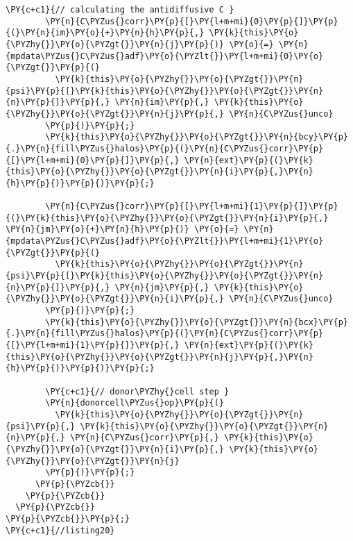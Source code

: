 \begin{Verbatim}[commandchars=\\\{\}]
        \PY{c+c1}{// calculating the antidiffusive C }
        \PY{n}{C\PYZus{}corr}\PY{p}{[}\PY{l+m+mi}{0}\PY{p}{]}\PY{p}{(}\PY{n}{im}\PY{o}{+}\PY{n}{h}\PY{p}{,} \PY{k}{this}\PY{o}{\PYZhy{}}\PY{o}{\PYZgt{}}\PY{n}{j}\PY{p}{)} \PY{o}{=} \PY{n}{mpdata\PYZus{}C\PYZus{}adf}\PY{o}{\PYZlt{}}\PY{l+m+mi}{0}\PY{o}{\PYZgt{}}\PY{p}{(}
          \PY{k}{this}\PY{o}{\PYZhy{}}\PY{o}{\PYZgt{}}\PY{n}{psi}\PY{p}{[}\PY{k}{this}\PY{o}{\PYZhy{}}\PY{o}{\PYZgt{}}\PY{n}{n}\PY{p}{]}\PY{p}{,} \PY{n}{im}\PY{p}{,} \PY{k}{this}\PY{o}{\PYZhy{}}\PY{o}{\PYZgt{}}\PY{n}{j}\PY{p}{,} \PY{n}{C\PYZus{}unco}
        \PY{p}{)}\PY{p}{;}
        \PY{k}{this}\PY{o}{\PYZhy{}}\PY{o}{\PYZgt{}}\PY{n}{bcy}\PY{p}{.}\PY{n}{fill\PYZus{}halos}\PY{p}{(}\PY{n}{C\PYZus{}corr}\PY{p}{[}\PY{l+m+mi}{0}\PY{p}{]}\PY{p}{,} \PY{n}{ext}\PY{p}{(}\PY{k}{this}\PY{o}{\PYZhy{}}\PY{o}{\PYZgt{}}\PY{n}{i}\PY{p}{,}\PY{n}{h}\PY{p}{)}\PY{p}{)}\PY{p}{;}

        \PY{n}{C\PYZus{}corr}\PY{p}{[}\PY{l+m+mi}{1}\PY{p}{]}\PY{p}{(}\PY{k}{this}\PY{o}{\PYZhy{}}\PY{o}{\PYZgt{}}\PY{n}{i}\PY{p}{,} \PY{n}{jm}\PY{o}{+}\PY{n}{h}\PY{p}{)} \PY{o}{=} \PY{n}{mpdata\PYZus{}C\PYZus{}adf}\PY{o}{\PYZlt{}}\PY{l+m+mi}{1}\PY{o}{\PYZgt{}}\PY{p}{(}
          \PY{k}{this}\PY{o}{\PYZhy{}}\PY{o}{\PYZgt{}}\PY{n}{psi}\PY{p}{[}\PY{k}{this}\PY{o}{\PYZhy{}}\PY{o}{\PYZgt{}}\PY{n}{n}\PY{p}{]}\PY{p}{,} \PY{n}{jm}\PY{p}{,} \PY{k}{this}\PY{o}{\PYZhy{}}\PY{o}{\PYZgt{}}\PY{n}{i}\PY{p}{,} \PY{n}{C\PYZus{}unco}
        \PY{p}{)}\PY{p}{;}
        \PY{k}{this}\PY{o}{\PYZhy{}}\PY{o}{\PYZgt{}}\PY{n}{bcx}\PY{p}{.}\PY{n}{fill\PYZus{}halos}\PY{p}{(}\PY{n}{C\PYZus{}corr}\PY{p}{[}\PY{l+m+mi}{1}\PY{p}{]}\PY{p}{,} \PY{n}{ext}\PY{p}{(}\PY{k}{this}\PY{o}{\PYZhy{}}\PY{o}{\PYZgt{}}\PY{n}{j}\PY{p}{,}\PY{n}{h}\PY{p}{)}\PY{p}{)}\PY{p}{;}

        \PY{c+c1}{// donor\PYZhy{}cell step }
        \PY{n}{donorcell\PYZus{}op}\PY{p}{(}
          \PY{k}{this}\PY{o}{\PYZhy{}}\PY{o}{\PYZgt{}}\PY{n}{psi}\PY{p}{,} \PY{k}{this}\PY{o}{\PYZhy{}}\PY{o}{\PYZgt{}}\PY{n}{n}\PY{p}{,} \PY{n}{C\PYZus{}corr}\PY{p}{,} \PY{k}{this}\PY{o}{\PYZhy{}}\PY{o}{\PYZgt{}}\PY{n}{i}\PY{p}{,} \PY{k}{this}\PY{o}{\PYZhy{}}\PY{o}{\PYZgt{}}\PY{n}{j}
        \PY{p}{)}\PY{p}{;}
      \PY{p}{\PYZcb{}}
    \PY{p}{\PYZcb{}}
  \PY{p}{\PYZcb{}}
\PY{p}{\PYZcb{}}\PY{p}{;}
\PY{c+c1}{//listing20}
\end{Verbatim}
